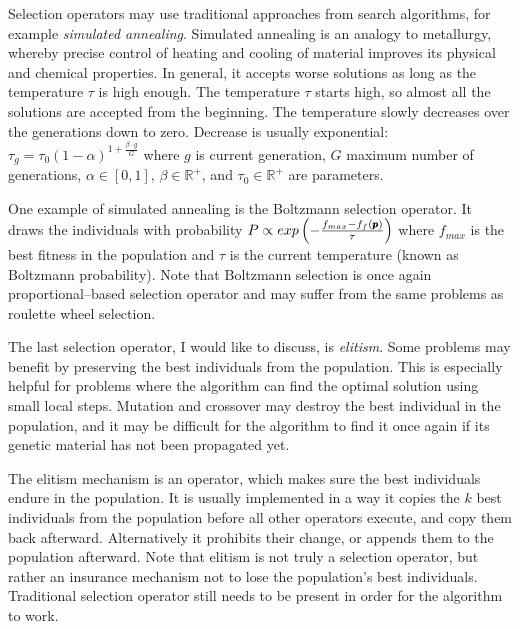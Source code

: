 Selection operators may use traditional approaches from search algorithms, for example \emph{simulated annealing}. Simulated annealing is an analogy to metallurgy, whereby precise control of heating and cooling of material improves its physical and chemical properties. In general, it accepts worse solutions as long as the temperature $\tau$ is high enough. The temperature $\tau$ starts high, so almost all the solutions are accepted from the beginning. The temperature slowly decreases over the generations down to zero. Decrease is usually exponential: $\tau_g=\tau_0(1-\alpha)^{1+\frac{\beta\cdot g}{G}}$ where $g$ is current generation, $G$ maximum number of generations, $\alpha\in\left[0,1\right]$, $\beta\in\mathbb{R}^+$, and $\tau_0\in\mathbb{R}^+$ are parameters. 

One example of simulated annealing is the Boltzmann selection operator. It draws the individuals with probability 
$P\propto exp\left(-\frac{f_{max} - f_f(\pmb{p})}{\tau}\right)$
where $f_{max}$ is the best fitness in the population and $\tau$ is the current temperature (known as Boltzmann probability). Note that Boltzmann selection is once again proportional--based selection operator and may suffer from the same problems as roulette wheel selection.

The last selection operator, I would like to discuss, is \emph{elitism}. Some problems may benefit by preserving the best individuals from the population. This is especially helpful for problems where the algorithm can find the optimal solution using small local steps. Mutation and crossover may destroy the best individual in the population, and it may be difficult for the algorithm to find it once again if its genetic material has not been propagated yet.

The elitism mechanism is an operator, which makes sure the best individuals endure in the population. It is usually implemented in a way it copies the $k$ best individuals from the population before all other operators execute, and copy them back afterward. Alternatively it prohibits their change, or appends them to the population afterward. Note that elitism is not truly a selection operator, but rather an insurance mechanism not to lose the population's best individuals. Traditional selection operator still needs to be present in order for the algorithm to work. 




